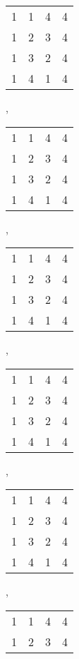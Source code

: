 \documentclass{amsart}
\theoremstyle{plain}
\theoremstyle{definition}
\begin{document}
\begin{figure}
\renewcommand{\arraystretch}{0.3}
\begin{center}
\begin{tabular}{@{}c@{}c@{}c@{}c@{}}
1&1&4&4\\
1&2&3&4\\
1&3&2&4\\
1&4&1&4\\
\end{tabular},\ \ \ 
\begin{tabular}{@{}c@{}c@{}c@{}c@{}}
1&1&\color{lgr}4&4\\
1&2&\color{lgr}3&4\\
\color{lgr}1&\color{lgr}3&\color{lgr}2&\color{lgr}4\\
1&4&\color{lgr}1&4\\
\end{tabular},\ \ \ 
\begin{tabular}{@{}c@{}c@{}c@{}c@{}}
\color{lgr}1&\color{lgr}1&\color{lgr}4&\color{lgr}4\\
\color{lgr}1&2&\color{lgr}3&4\\
\color{lgr}1&\color{lgr}3&\color{lgr}2&\color{lgr}4\\
\color{lgr}1&4&\color{lgr}1&4\\
\end{tabular},\ \ \ 
\begin{tabular}{@{}c@{}c@{}c@{}c@{}}
\color{lgr}1&\color{lgr}1&\color{lgr}4&\color{lgr}4\\
\color{lgr}1&\color{lgr}2&\color{lgr}3&\color{lgr}4\\
\color{lgr}1&\color{lgr}3&\color{lgr}2&\color{lgr}4\\
\color{lgr}1&\color{lgr}4&\color{lgr}1&4\\
\end{tabular},\ \ \ 
\begin{tabular}{@{}c@{}c@{}c@{}c@{}}
1&1&\color{lgr}4&\color{lgr}4\\
1&2&\color{lgr}3&\color{lgr}4\\
\color{lgr}1&\color{lgr}3&\color{lgr}2&\color{lgr}4\\
\color{lgr}1&\color{lgr}4&\color{lgr}1&\color{lgr}4\\
\end{tabular},\ \ \ 
\begin{tabular}{@{}c@{}c@{}c@{}c@{}}
1&\color{lgr}1&\color{lgr}4&4\\
\color{lgr}1&\color{lgr}2&\color{lgr}3&\color{lgr}4\\

\end{tabular}
\end{center}
\end{figure}
\end{document}
